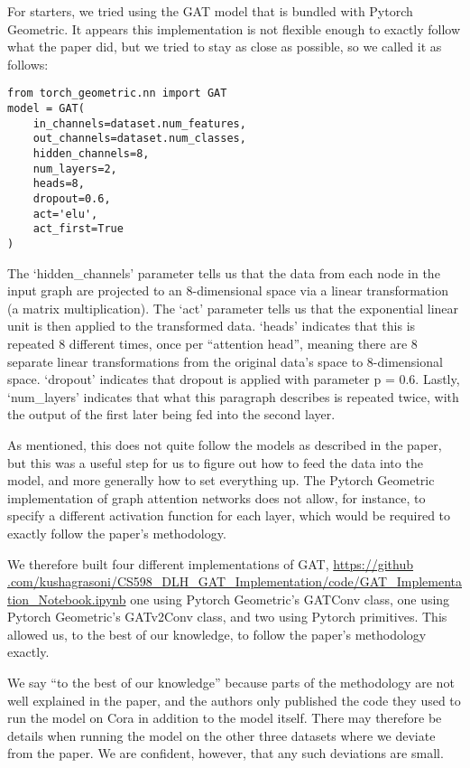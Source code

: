 For starters, we tried using the GAT model that is bundled with Pytorch
Geometric. It appears this implementation is not flexible enough to exactly
follow what the paper did, but we tried to stay as close as possible, so we
called it as follows:

\begin{verbatim}
from torch_geometric.nn import GAT
model = GAT(
    in_channels=dataset.num_features,
    out_channels=dataset.num_classes,
    hidden_channels=8,
    num_layers=2,
    heads=8,
    dropout=0.6,
    act='elu',
    act_first=True
)
\end{verbatim}

The `hidden\_channels' parameter tells us that the data from each node in the
input graph are projected to an 8-dimensional space via a linear transformation
(a matrix multiplication). The `act' parameter tells us that the exponential
linear unit is then applied to the transformed data.  `heads' indicates that
this is repeated 8 different times, once per ``attention head'', meaning there
are 8 separate linear transformations from the original data's space to
8-dimensional space. `dropout' indicates that dropout is applied with
parameter p = 0.6. Lastly, `num\_layers' indicates that what this paragraph
describes is repeated twice, with the output of the first later being fed into
the second layer.

As mentioned, this does not quite follow the models as described in the paper,
but this was a useful step for us to figure out how to feed the data into the
model, and more generally how to set everything up.
The Pytorch Geometric implementation of graph attention networks does not allow, for instance, to
specify a different activation function for each layer, which would be required
to exactly follow the paper's methodology.

We therefore built four different implementations of GAT, \url{https://github
.com/kushagrasoni/CS598_DLH_GAT_Implementation/code/GAT_Implementation_Notebook.ipynb}
one using Pytorch Geometric's GATConv class, one using Pytorch Geometric's GATv2Conv class, and
two using Pytorch primitives.
This allowed us, to the best of our knowledge, to follow the paper's methodology exactly.

We say ``to the best of our knowledge'' because parts of the methodology are not well explained in the paper, and the
authors only published the code they used to run the model on Cora in addition
to the model itself.
There may therefore be details when running the model on the other three datasets where we deviate from the paper.
We are confident, however, that any such deviations are small.
